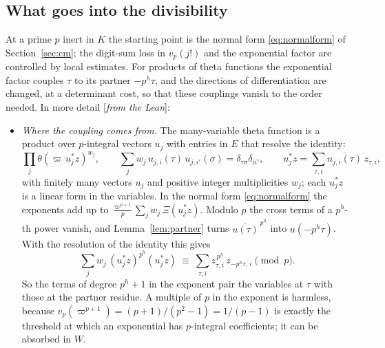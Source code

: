 \documentclass[11pt]{amsart}
\numberwithin{equation}{section}
\theoremstyle{definition}
\theoremstyle{remark}
\newcommand{\status}[1]{\textup{[\emph{#1}]}}
\begin{document}
\subsection*{What goes into the divisibility}
At a prime $p$ inert in $K$ the starting point is the normal form \eqref{eq:normalform} of Section~\ref{sec:cm}; the digit-sum loss in $v_p(j!)$ and the exponential factor are controlled by local estimates. For products of theta functions the exponential factor couples $\tau$ to its partner $-p^h\tau$, and the directions of differentiation are changed, at a determinant cost, so that these couplings vanish to the order needed. In more detail \status{from the Lean}:
\begin{itemize}[leftmargin=2em]
\item \emph{Where the coupling comes from.} The many-variable theta function is a product over $p$-integral vectors $u_j$ with entries in $E$ that resolve the identity:
\begin{equation}\label{eq:thetaprod}
 \prod_j\theta(\varpi\,u_j^*z)^{w_j},\qquad\sum_jw_j\,u_{j,i}(\tau)\,\overline{u_{j,i'}(\sigma)}=\delta_{\tau\sigma}\delta_{ii'},\qquad u_j^*z=\sum_{\tau,i}\overline{u_{j,i}(\tau)}\,z_{\tau,i},
\end{equation}
with finitely many vectors $u_j$ and positive integer multiplicities $w_j$; each $u_j^*z$ is a linear form in the variables. In the normal form \eqref{eq:normalform} the exponents add up to $\frac{\varpi^{p+1}}p\sum_jw_j\,\Xi(u_j^*z)$. Modulo $p$ the cross terms of a $p^h$-th power vanish, and Lemma~\ref{lem:partner} turns $\overline{u(\tau)}^{\,p^h}$ into $u(-p^h\tau)$. With the resolution of the identity this gives
\begin{equation}\label{eq:coupling}
 \sum_jw_j\,(u_j^*z)^{p^h}(u_j^*z)\ \equiv\ \sum_{\tau,i}z_{\tau,i}^{\,p^h}\,z_{-p^h\tau,\,i}\pmod p .
\end{equation}
So the terms of degree $p^h+1$ in the exponent pair the variables at $\tau$ with those at the partner residue. A multiple of $p$ in the exponent is harmless, because $v_p(\varpi^{p+1})=(p+1)/(p^2-1)=1/(p-1)$ is exactly the threshold at which an exponential has $p$-integral coefficients; it can be absorbed in $W$.

\end{itemize}
\end{document}
